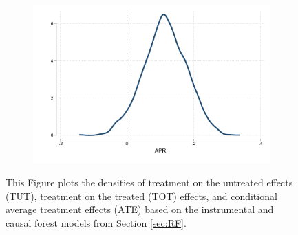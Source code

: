 \documentclass[oneside,11pt]{article}
\begin{document}
\begin{figure}[H]
\begin{center}
\begin{subfigure}{.55\textwidth}
        \includegraphics[width=\textwidth]{Figuras/he_dist_tau_hat_eff.pdf}
    \end{subfigure} 
      
          
    \end{center}
         \scriptsize
     This Figure plots the densities of treatment on the untreated effects (TUT), treatment on the treated (TOT) effects, and conditional average treatment effects (ATE) based on the instrumental and causal forest models from Section \ref{sec:RF}.
\end{figure}
\end{document}
